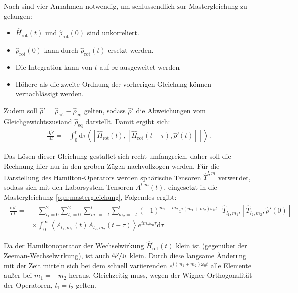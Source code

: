 Nach \cite[S. 276]{spiess} sind vier Annahmen notwendig, um schlussendlich zur Mastergleichung zu gelangen:
\begin{itemize}
\item $\hat{H}_\text{rot}(t)$ und $\hat{\rho}_\text{rot}(0)$ sind unkorreliert.
\item $\hat{\rho}_\text{rot}(0)$ kann durch $\hat{\rho}_\text{rot}(t)$ ersetzt werden.
\item Die Integration kann von $t$ auf $\infty$ ausgeweitet werden.
\item Höhere als die zweite Ordnung der vorherigen Gleichung können vernachlässigt werden.
\end{itemize}
Zudem soll $\hat{\rho}' = \hat{\rho}_\text{rot} - \hat{\rho}_\text{eq}$ gelten, sodass $\hat{\rho}'$ die Abweichungen vom Gleichgewichtszustand $\hat{\rho}_\text{eq}$ darstellt.
Damit ergibt sich:
\begin{align}
    \frac{\text{d} \hat{\rho}'}{\text{d}t} = - \int_0^t \text{d} \tau \left< \left[\hat{H}_\text{rot}(t), [\hat{H}_\text{rot}(t-\tau), \hat{\rho}'(t)] \right] \right>. \label{eqn:mastergleichung}
\end{align}

Das Lösen dieser Gleichung gestaltet sich recht umfangreich, daher soll die Rechnung hier nur in den groben Zügen nachvollzogen werden.
Für die Darstellung des Hamilton-Operators werden sphärische Tensoren $\hat{T}^{l,m}$ verwendet, sodass sich mit den Laborsystem-Tensoren $A^{l,m}(t)$, eingesetzt in die Mastergleichung \eqref{eqn:mastergleichung}, Folgendes ergibt:
\begin{align}
\begin{split}
    \frac{\text{d} \hat{\rho}'}{\text{d}t} =& -\sum_{l_1 = 0}^2 \sum_{l_2 = 0}^2 \sum_{m_1 = -l}^l \sum_{m_2 = -l}^l (-1)^{m_1+m_2} e^{i(m_1+m_2) \omega_0 t} \left[\hat{T}_{l_1,m_1}, [\hat{T}_{l_2,m_2}, \hat{\rho}'(0)] \right] \\ &\times \int_0^\infty \left< A_{l_1,m_1}(t) A_{l_2,m_2}(t-\tau) \right> e^{i m_2 \omega_0 \tau} \text{d} \tau
\end{split}
\end{align}

Da der Hamiltonoperator der Wechselwirkung $\hat{H}_\text{rot}(t)$ klein ist (gegenüber der Zeeman-Wechselwirkung), ist auch $\sfrac{\text{d} \hat{\rho}'}{\text{d}t}$ klein. Durch diese langsame Änderung mit der Zeit mitteln sich bei dem schnell variierenden $e^{i(m_1+m_2) \omega_0 t}$ alle Elemente außer bei $m_1 = - m_2$ heraus. Gleichzeitig muss, wegen der Wigner-Orthogonalität der Operatoren, $l_1 = l_2$ gelten.

